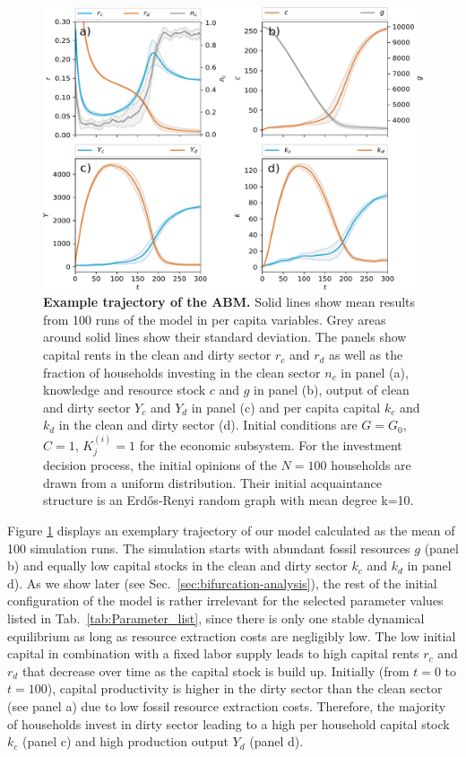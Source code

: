 \begin{figure}[h]
  \centering\includegraphics[width=.9\linewidth]{figures/example_trajectory.pdf}
  \caption{\textbf{Example trajectory of the ABM.} Solid lines show mean results from 100 runs of the model in per capita variables. Grey areas around solid lines show their standard deviation. The panels show capital rents in the clean and dirty sector $r_c$ and $r_d$ as well as the fraction of households investing in the clean sector $n_c$ in panel (a), knowledge and resource stock $c$ and $g$ in panel (b), output of clean and dirty sector $Y_c$ and $Y_d$ in panel (c) and per capita capital $k_c$ and $k_d$ in the clean and dirty sector (d).
Initial conditions are $G=G_0$, $C=1$, $K_j^{(i)}=1$ for the economic subsystem. For the investment decision process, the initial opinions of the $N=100$ households are drawn from a uniform distribution. Their initial acquaintance structure is an Erd\H{o}s-Renyi random graph with mean degree k=10.}
\label{fig:example_trajectory}
\end{figure}

Figure \ref{fig:example_trajectory} displays an exemplary trajectory of our model calculated as the mean of 100 simulation runs.
The simulation starts with abundant fossil resources $g$ (panel b) and equally low capital stocks in the clean and dirty sector $k_c$ and $k_d$ in panel d). As we show later (see Sec.~\ref{sec:bifurcation-analysis}), the rest of the initial configuration of the model is rather irrelevant for the selected parameter values listed in Tab.~\ref{tab:Parameter_list}, since there is only one stable dynamical equilibrium as long as resource extraction costs are negligibly low.
The low initial capital in combination with a fixed labor supply leads to high capital rents $r_c$ and $r_d$ that decrease over time as the capital stock is build up.
Initially (from $t=0$ to $t=100$), capital productivity is higher in the dirty sector than the clean sector (see panel a) due to low fossil resource extraction costs. %
Therefore, the majority of households invest in dirty sector leading to a high per household capital stock $k_c$ (panel c) and high production output $Y_d$ (panel d).

